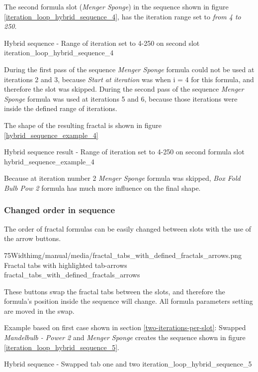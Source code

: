 The second formula slot (\emph{Menger Sponge}) in the sequence shown in figure \ref{iteration_loop_hybrid_sequence_4}, has the iteration range set to \emph{from 4 to 250}.


{Hybrid sequence - Range of iteration set to 4-250 on second slot}
{iteration_loop_hybrid_sequence_4}

During the first pass of the sequence \emph{Menger Sponge} formula could not be used at iterations 2 and 3,
because \emph{Start at iteration} was when i = 4 for this formula, and therefore the slot was skipped.
During the second pass of the sequence \emph{Menger Sponge} formula was used at iterations 5 and 6,
because those iterations were inside the defined range of iterations.

The shape of the resulting fractal is shown in figure \ref{hybrid_sequence_example_4}

{Hybrid sequence result - Range of iteration set to 4-250 on second formula slot}
{hybrid_sequence_example_4}

Because at iteration number 2 \emph{Menger Sponge} formula was skipped, \emph{Box Fold Bulb Pow 2} formula has much more influence on the final shape.

\subsubsection{Changed order in sequence}

The order of fractal formulas can be easily changed between slots with the use of the arrow buttons.

\simpleImageWithCaption75Width{img/manual/media/fractal_tabs_with_defined_fractals_arrows.png}
{Fractal tabs with highlighted tab-arrows}
{fractal_tabs_with_defined_fractals_arrows}

These buttons swap the fractal tabs between the slots, and therefore  the formula's position inside the sequence will change. All formula parameters setting are moved in the swap.

Example based on first case shown in section \ref{two-iterations-per-slot}:
Swapped \emph{Mandelbulb - Power 2} and \emph{Menger Sponge} creates the sequence shown in figure \ref{iteration_loop_hybrid_sequence_5}.

{Hybrid sequence - Swapped tab one and two}
{iteration_loop_hybrid_sequence_5}

